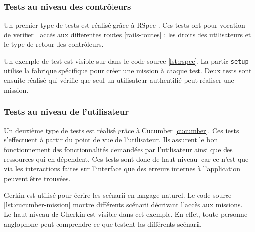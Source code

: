 \subsubsection{Tests au niveau des contrôleurs}
Un premier type de tests est réalisé grâce à RSpec \cite{rspec}. Ces tests ont pour vocation de vérifier l'accès aux différentes routes \ref{rails-routes} : les droits des utilisateurs et le type de retour des contrôleurs.

Un exemple de test est visible sur dans le code source \ref{lst:rspec}. La partie \texttt{setup} utilise la fabrique spécifique pour créer une mission à chaque test. Deux tests sont ensuite réalisé qui vérifie que seul un utilisateur authentifié peut réaliser une mission.

\begin{figure}

\end{figure}

\subsubsection{Tests au niveau de l'utilisateur}
Un deuxième type de tests est réalisé grâce à Cucumber \ref{cucumber}. Ces tests s'effectuent à partir du point de vue de l'utilisateur. Ils assurent le bon fonctionnement des fonctionnalités demandées par l'utilisateur ainsi que des ressources qui en dépendent. Ces tests sont donc de haut niveau, car ce n'est que via les interactions faites sur l'interface que des erreurs internes à l'application peuvent être trouvées.

\begin{figure}

\end{figure}

\begin{figure}

\end{figure}

Gerkin est utilisé pour écrire les scénarii en langage naturel.
Le code source \ref{lst:cucumber-mission} montre différents scénarii décrivant l'accès aux missions. Le haut niveau de Gherkin est visible dans cet exemple. En effet, toute personne anglophone peut comprendre ce que testent les différents scénarii.

